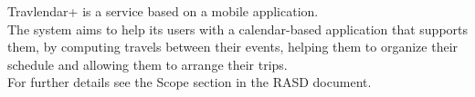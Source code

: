 Travlendar+ is a service based on a mobile application.\\
The system aims to help its users with a calendar-based application that supports them,  by computing travels between their events, helping them to organize their schedule and allowing them to arrange their trips. \\ 
For further details see the Scope section in the RASD document.